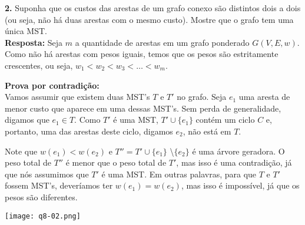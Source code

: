 
\noindent\textbf{2.} Suponha que os custos das arestas de um grafo conexo são distintos dois a dois (ou seja, não há duas arestas com o mesmo custo). Mostre que o grafo tem uma única MST.\\[6pt]
\textbf{Resposta:} Seja $m$ a quantidade de arestas em um grafo ponderado $G(V, E, w)$. Como não há arestas com pesos iguais, temos que os pesos são estritamente crescentes, ou seja, $w_1 < w_2 < w_3 < \ldots < w_m$.

\textbf{Prova por contradição:}\\
Vamos assumir que existem duas MST's $T$ e $T'$ no grafo. Seja $e_1$ uma aresta de menor custo que aparece em uma dessas MST's. Sem perda de generalidade, digamos que $e_1 \in T$. Como $T'$ é uma MST, $T' \cup \{e_1\}$ contém um ciclo $C$ e, portanto, uma das arestas deste ciclo, digamos $e_2$, não está em $T$.

Note que $w(e_1) < w(e_2)$ e $T'' = T' \cup \{e_1\}$ \textbackslash $\{e_2\}$ é uma árvore geradora. O peso total de $T''$ é menor que o peso total de $T'$, mas isso é uma contradição, já que nós assumimos que $T'$ é uma MST. Em outras palavras, para que $T$ e $T'$ fossem MST's, deveríamos ter $w(e_1) = w(e_2)$, mas isso é impossível, já que os pesos são diferentes.

\begin{center}
\texttt{[image: q8-02.png]}
\label{fig:8.2-1}
\end{center}